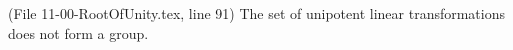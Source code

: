 
\def\Erratum#1#2#3{(File #1, line #2) #3}


\Erratum{11-00-RootOfUnity.tex}{91}{The set of unipotent linear transformations does not form a group.}




